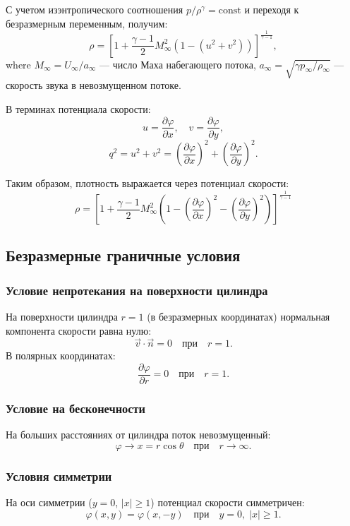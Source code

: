 \documentclass[a4paper,12pt]{article}
\begin{document}
	С учетом изэнтропического соотношения $p / \rho^\gamma = \text{const}$ и переходя к безразмерным переменным, получим:
	\[
	\rho = \left[ 1 + \frac{\gamma-1}{2} M_\infty^2 \left( 1 - (u^2 + v^2) \right) \right]^{\frac{1}{\gamma-1}},
	\]
	where $M_\infty = U_\infty / a_\infty$ — число Маха набегающего потока, $a_\infty = \sqrt{\gamma p_\infty / \rho_\infty}$ — скорость звука в невозмущенном потоке.
	
	В терминах потенциала скорости:
	\[
	u = \frac{\partial \varphi}{\partial x}, \quad v = \frac{\partial \varphi}{\partial y},
	\]
	\[
	q^2 = u^2 + v^2 = \left( \frac{\partial \varphi}{\partial x} \right)^2 + \left( \frac{\partial \varphi}{\partial y} \right)^2.
	\]
	
	Таким образом, плотность выражается через потенциал скорости:
	\begin{equation}
		\boxed{\rho = \left[ 1 + \frac{\gamma-1}{2} M_\infty^2 \left( 1 - \left( \frac{\partial \varphi}{\partial x} \right)^2 - \left( \frac{\partial \varphi}{\partial y} \right)^2 \right) \right]^{\frac{1}{\gamma-1}}}
		\label{eq:density}
	\end{equation}
	
	\subsection{Безразмерные граничные условия}
	
	\subsubsection{Условие непротекания на поверхности цилиндра}
	На поверхности цилиндра $r = 1$ (в безразмерных координатах) нормальная компонента скорости равна нулю:
	\[
	\vec{v} \cdot \vec{n} = 0 \quad \text{при} \quad r = 1.
	\]
	В полярных координатах:
	\[
	\frac{\partial \varphi}{\partial r} = 0 \quad \text{при} \quad r = 1.
	\]
	
	\subsubsection{Условие на бесконечности}
	На больших расстояниях от цилиндра поток невозмущенный:
	\[
	\varphi \to x = r \cos \theta \quad \text{при} \quad r \to \infty.
	\]
	
	\subsubsection{Условия симметрии}
	На оси симметрии ($y = 0$, $|x| \ge 1$) потенциал скорости симметричен:
	\[
	\varphi(x, y) = \varphi(x, -y) \quad \text{при} \quad y = 0, \; |x| \ge 1.
	\]
	
\end{document}
